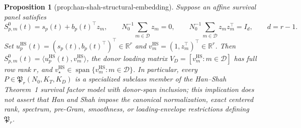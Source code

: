 \documentclass{article}
\newtheorem{proposition}{Proposition}
\begin{document}
\begin{proposition}[prop:han-shah-structural-embedding]\label{prop:han-shah-structural-embedding}
Suppose an affine survival panel satisfies
\[
 S^0_{p,m}(t)=s_p(t)+b_p(t)^\top z_m,
 \qquad
 N_0^{-1}\sum_{m\in\mathcal D}z_m=0,
 \qquad
 N_0^{-1}\sum_{m\in\mathcal D}z_mz_m^\top=I_d,
 \qquad d=r-1.
\]
Set \(u_p^{\mathrm{HS}}(t)=(s_p(t),b_p(t)^\top)^\top\in\mathbb R^r\) and \(v_m^{\mathrm{HS}}=(1,z_m^\top)^\top\in\mathbb R^r\).  Then \(S^0_{p,m}(t)=\langle u_p^{\mathrm{HS}}(t),v_m^{\mathrm{HS}}\rangle\), the donor loading matrix \(V_D=[v_m^{\mathrm{HS}}:m\in\mathcal D]\) has full row rank \(r\), and \(v_\star^{\mathrm{HS}}\in\operatorname{span}\{v_m^{\mathrm{HS}}:m\in\mathcal D\}\).  In particular, every \(P\in\mathfrak P_r(N_0,K_T,K_D)\) is a specialized subclass member of the Han--Shah Theorem~1 survival factor model with donor-span inclusion; this implication does not assert that Han and Shah impose the canonical normalization, exact centered rank, spectrum, pre-Gram, smoothness, or loading-envelope restrictions defining \(\mathfrak P_r\).
\end{proposition}
\end{document}
